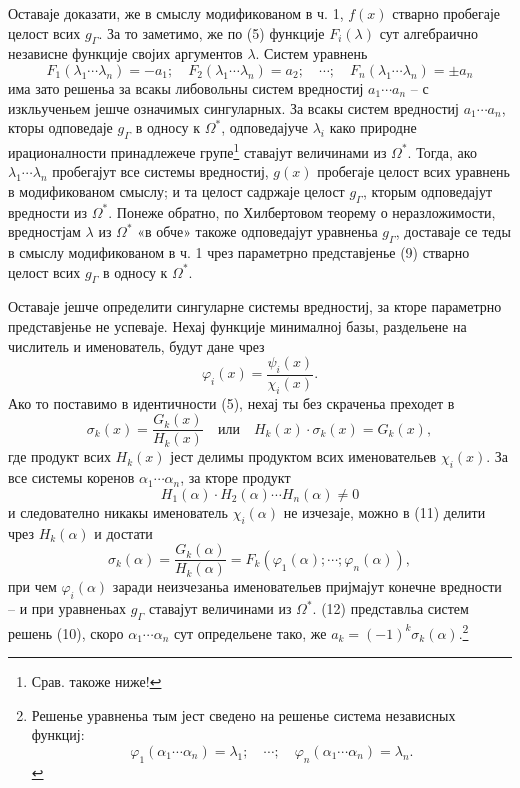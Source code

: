 ﻿\documentclass[11pt]{article}
\begin{document}
Оставаје доказати, же в смыслу модификованом в ч. 1, $f(x)$ стварно пробегаје целост всих $g_\Gamma$. За то заметимо, же по (5) функције $F_i(\lambda)$ сут алгебраично независне функције својих аргументов $\lambda$. Систем уравнень
\begin{equation}
F_1(\lambda_1\cdots\lambda_n)=-a_1;\quad F_2(\lambda_1\cdots\lambda_n)=a_2;\quad \cdots;\quad F_n(\lambda_1\cdots\lambda_n)=\pm a_n
\tag{10}
\end{equation}
има зато решеньа за всакы либовольны систем вредностиј $a_1\cdots a_n$ -- с изкльученьем јешче означимых сингуларных. За всакы систем вредностиј $a_1\cdots a_n$, кторы одповедаје $g_\Gamma$ в односу к $\Omega^*$, одповедајуче $\lambda_i$ како природне ирационалности принадлежече групе\footnote{Срав. такоже ниже!} ставајут величинами из $\Omega^*$. Тогда, ако $\lambda_1\cdots\lambda_n$ пробегајут все системы вредностиј, $g(x)$ пробегаје целост всих уравнень в модификованом смыслу; и та целост садржаје целост $g_\Gamma$, кторым одповедајут вредности из $\Omega^*$. Понеже обратно, по Хилбертовом теорему о неразложимости, вредностјам $\lambda$ из $\Omega^*$ «в обче» такоже одповедајут уравненьа $g_\Gamma$, доставаје се теды в смыслу модификованом в ч. 1 чрез параметрно представјенье (9) стварно целост всих $g_\Gamma$ в односу к $\Omega^*$.

Оставаје јешче определити сингуларне системы вредностиј, за кторе параметрно представјенье не успеваје. Нехај функције минималној базы, раздельене на числитель и именователь, будут дане чрез
\[
\varphi_i(x)=\frac{\psi_i(x)}{\chi_i(x)}.
\]
Ако то поставимо в идентичности (5), нехај ты без скраченьа преходет в
\begin{equation}
\sigma_k(x)=\frac{G_k(x)}{H_k(x)}\quad\text{или}\quad H_k(x)\cdot\sigma_k(x)=G_k(x),
\tag{11}
\end{equation}
где продукт всих $H_k(x)$ јест делимы продуктом всих именовательев $\chi_i(x)$. За все системы коренов $\alpha_1\cdots\alpha_n$, за кторе продукт
\[
H_1(\alpha)\cdot H_2(\alpha)\cdots H_n(\alpha)\neq0
\]
и следователно никакы именователь $\chi_i(\alpha)$ не изчезаје, можно в (11) делити чрез $H_k(\alpha)$ и достати
\begin{equation}
\sigma_k(\alpha)=\frac{G_k(\alpha)}{H_k(\alpha)}=F_k(\varphi_1(\alpha);\cdots;\varphi_n(\alpha)),
\tag{12}
\end{equation}
при чем $\varphi_i(\alpha)$ заради неизчезаньа именовательев пријмајут конечне вредности -- и при уравненьах $g_\Gamma$ ставајут величинами из $\Omega^*$. (12) представльа систем решень (10), скоро $\alpha_1\cdots\alpha_n$ сут определьене тако, же $a_k=(-1)^k\sigma_k(\alpha)$.\footnote{Решенье уравненьа тым јест сведено на решенье система независных функциј:
\[
\varphi_1(\alpha_1\cdots\alpha_n)=\lambda_1;\quad \cdots;\quad \varphi_n(\alpha_1\cdots\alpha_n)=\lambda_n.
\]}
\end{document}
